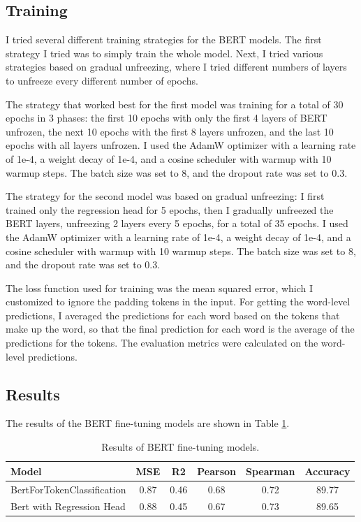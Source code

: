 \subsection{Training}
I tried several different training strategies for the BERT models. The first strategy I tried was to simply train the whole model. Next, I tried various strategies based on gradual unfreezing, where I tried different numbers of layers to unfreeze every different number of epochs.

The strategy that worked best for the first model was training for a total of 30 epochs in 3 phases: the first 10 epochs with only the first 4 layers of BERT unfrozen, the next 10 epochs with the first 8 layers unfrozen, and the last 10 epochs with all layers unfrozen. I used the AdamW optimizer with a learning rate of 1e-4, a weight decay of 1e-4, and a cosine scheduler with warmup with 10 warmup steps. The batch size was set to 8, and the dropout rate was set to 0.3.

The strategy for the second model was based on gradual unfreezing: I first trained only the regression head for 5 epochs, then I gradually unfreezed the BERT layers, unfreezing 2 layers every 5 epochs, for a total of 35 epochs. I used the AdamW optimizer with a learning rate of 1e-4, a weight decay of 1e-4, and a cosine scheduler with warmup with 10 warmup steps. The batch size was set to 8, and the dropout rate was set to 0.3.

The loss function used for training was the mean squared error, which I customized to ignore the padding tokens in the input. For getting the word-level predictions, I averaged the predictions for each word based on the tokens that make up the word, so that the final prediction for each word is the average of the predictions for the tokens. The evaluation metrics were calculated on the word-level predictions.

\subsection{Results}
The results of the BERT fine-tuning models are shown in Table \ref{tab:bert_finetuning_results}.

\begin{table}
    \centering
    \begin{tabular}{|l|c|c|c|c|c|}
        \hline
        Model & MSE & R2 & Pearson & Spearman & Accuracy \\
        \hline
        BertForTokenClassification & 0.87 & 0.46 & 0.68 & 0.72 & 89.77 \\
        Bert with Regression Head & 0.88 & 0.45 & 0.67 & 0.73 & 89.65 \\
        \hline
    \end{tabular}
    \caption{Results of BERT fine-tuning models.}
    \label{tab:bert_finetuning_results}
\end{table}


